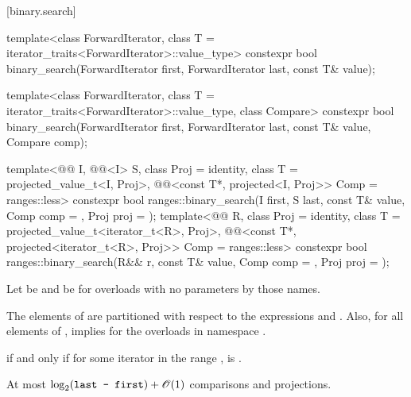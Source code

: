 [binary.search]{}

%
\begin{itemdecl}
template<class ForwardIterator, class T = iterator_traits<ForwardIterator>::value_type>
  constexpr bool
    binary_search(ForwardIterator first, ForwardIterator last,
                  const T& value);

template<class ForwardIterator, class T = iterator_traits<ForwardIterator>::value_type,
         class Compare>
  constexpr bool
    binary_search(ForwardIterator first, ForwardIterator last,
                  const T& value, Compare comp);

template<@@ I, @@<I> S, class Proj = identity,
         class T = projected_value_t<I, Proj>,
         @@<const T*, projected<I, Proj>> Comp = ranges::less>
  constexpr bool ranges::binary_search(I first, S last, const T& value, Comp comp = {},
                                       Proj proj = {});
template<@@ R, class Proj = identity,
         class T = projected_value_t<iterator_t<R>, Proj>,
         @@<const T*, projected<iterator_t<R>, Proj>> Comp =
           ranges::less>
  constexpr bool ranges::binary_search(R&& r, const T& value, Comp comp = {},
                                       Proj proj = {});
\end{itemdecl}

\begin{itemdescr}
\pnum
Let  be  and
 be 
for overloads with no parameters by those names.

\pnum
\expects
The elements  of 
are partitioned with respect to the expressions
 and
.
Also, for all elements  of \tcode{[first, last)},
 implies 
for the overloads in namespace .

\pnum
\returns
{} if and only if
for some iterator  in the range ,
is .

\pnum
\complexity
At most $\log_2(\texttt{\protect last - first}) + \mathscr{O}(1)$ comparisons and projections.
\end{itemdescr}

